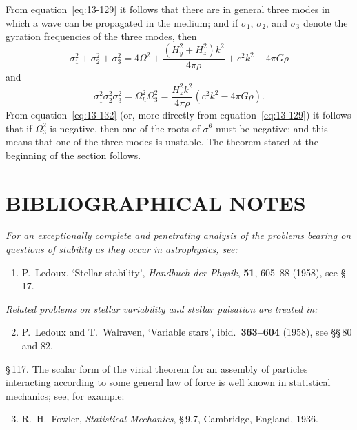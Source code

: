 From equation~\eqref{eq:13-129} it follows that there are in general three modes in which a wave can be propagated in the medium; and if $\sigma_1$, $\sigma_2$, and $\sigma_3$ denote the gyration frequencies of the three modes, then
\begin{equation}
\label{eq:13-131}
\sigma_1^2+\sigma_2^2+\sigma_3^2 = 4\Omega^2 + \frac{(H_y^2+H_z^2)k^2}{4\pi\rho} + c^2k^2 - 4\pi G\rho
\end{equation}
and
\begin{equation}
\label{eq:13-132}
\sigma_1^2\sigma_2^2\sigma_3^2 = \Omega_h^2\Omega_3^2 = \frac{H_z^2k^2}{4\pi\rho}(c^2k^2-4\pi G\rho).
\end{equation}
From equation~\eqref{eq:13-132} (or, more directly from equation~\eqref{eq:13-129}) it follows that if $\Omega_3^2$ is negative, then one of the roots of $\sigma^6$ must be negative; and this means that one of the three modes is unstable. The theorem stated at the beginning of the section follows.

\section*{BIBLIOGRAPHICAL NOTES}

\textit{For an exceptionally complete and penetrating analysis of the problems bearing on questions of stability as they occur in astrophysics, see:}

\begin{enumerate}
\item P.\ Ledoux, `Stellar stability', \textit{Handbuch der Physik}, \textbf{51}, 605--88 (1958), see \S\,17.
\end{enumerate}

\textit{Related problems on stellar variability and stellar pulsation are treated in:}

\begin{enumerate}
\setcounter{enumi}{1}
\item P.\ Ledoux and T.\ Walraven, `Variable stars', ibid.\ \textbf{363--604} (1958), see \S\S\,80 and 82.
\end{enumerate}

\S\,117. The scalar form of the virial theorem for an assembly of particles interacting according to some general law of force is well known in statistical mechanics; see, for example:

\begin{enumerate}
\setcounter{enumi}{2}
\item R.\ H.\ Fowler, \textit{Statistical Mechanics}, \S\,9.7, Cambridge, England, 1936.
\end{enumerate}

